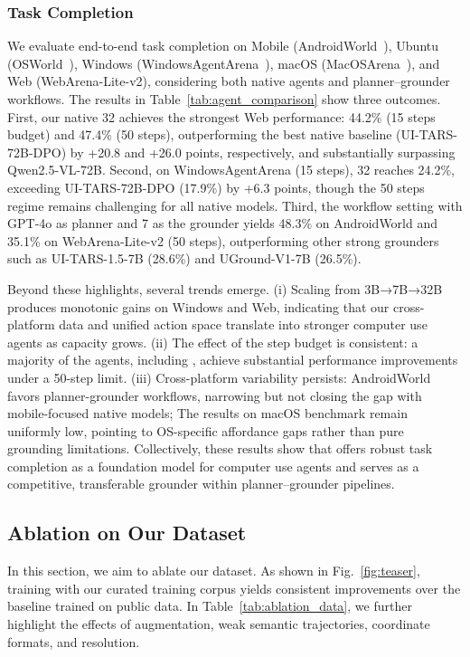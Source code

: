 \documentclass{article} %
\makeatletter
\DeclareRobustCommand{\modelname}{%
  \@ifnextchar\bgroup{\modelname@check}{\modelname@without}%
}
\newcommand{\modelname@check}[1]{%
  \@ifnextchar\bgroup{\modelname@two{#1}}{\modelname@one{#1}}%
}
\newcommand{\modelname@one}[1]{ScaleCUA-#1B\xspace}
\newcommand{\modelname@two}[2]{ScaleCUA-#1-#2B\xspace}
\newcommand{\modelname@without}{ScaleCUA\xspace}
\makeatother
\begin{document}
\subsubsection{Task Completion}
We evaluate end-to-end task completion on Mobile (AndroidWorld~\citep{rawles2024androidworld}), Ubuntu (OSWorld~\citep{xie2024osworld}), Windows (WindowsAgentArena~\citep{bonatti2024windows}), macOS (MacOSArena~\citep{wang2025mmbenchgui}), and Web (WebArena-Lite-v2), considering both native agents and planner–grounder workflows. The results in Table~\ref{tab:agent_comparison} show three outcomes. First, our native \modelname{32} achieves the strongest Web performance: 44.2\% (15 steps budget) and 47.4\% (50 steps), outperforming the best native baseline (UI-TARS-72B-DPO) by +20.8 and +26.0 points, respectively, and substantially surpassing Qwen2.5-VL-72B. 
Second, on WindowsAgentArena (15 steps), \modelname{32} reaches 24.2\%, exceeding UI-TARS-72B-DPO (17.9\%) by +6.3 points, though the 50 steps regime remains challenging for all native models. 
Third, the workflow setting with GPT-4o as planner and \modelname{7} as the grounder yields 48.3\% on AndroidWorld and 35.1\% on WebArena-Lite-v2 (50 steps), outperforming other strong grounders such as UI-TARS-1.5-7B (28.6\%) and UGround-V1-7B (26.5\%). 

Beyond these highlights, several trends emerge. (i) Scaling from 3B→7B→32B produces monotonic gains on Windows and Web, indicating that our cross-platform data and unified action space translate into stronger computer use agents as capacity grows. (ii) The effect of the step budget is consistent: a majority of the agents, including \modelname, achieve substantial performance improvements under a 50-step limit. (iii) Cross-platform variability persists: AndroidWorld favors planner-grounder workflows, narrowing but not closing the gap with mobile-focused native models; The results on macOS benchmark remain uniformly low, pointing to OS-specific affordance gaps rather than pure grounding limitations. Collectively, these results show that \modelname offers robust task completion as a foundation model for computer use agents and serves as a competitive, transferable grounder within planner–grounder pipelines.


\subsection{Ablation on Our Dataset}
In this section, we aim to ablate our dataset. As shown in Fig.~\ref{fig:teaser}, training with our curated training corpus yields consistent improvements over the baseline trained on public data. In Table~\ref{tab:ablation_data}, we further highlight the effects of augmentation, weak semantic trajectories, coordinate formats, and resolution.
\end{document}
